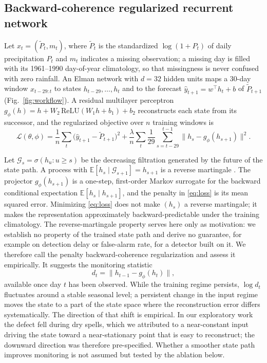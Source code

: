 \documentclass[pdflatex,sn-mathphys-ay]{sn-jnl}
\theoremstyle{thmstyletwo}
\begin{document}
\subsection{Backward-coherence regularized recurrent network}\label{sec:model}
Let $x_t=(\tilde P_t,m_t)$, where $\tilde P_t$ is the standardized $\log(1+P_t)$ of daily precipitation
$P_t$ and $m_t$ indicates a missing observation; a missing day is filled with its 1961--1990
day-of-year climatology, so that missingness is never confused with zero rainfall. An Elman network with
$d=32$ hidden units maps a 30-day window $x_{t-29:t}$ to states $h_{t-29},\dots,h_t$ and to the
forecast $\hat y_{t+1}=w^\top h_t+b$ of $\tilde P_{t+1}$ (Fig.~\ref{fig:workflow}). A residual
multilayer perceptron $g_\phi(h)=h+W_2\,\mathrm{ReLU}(W_1h+b_1)+b_2$ reconstructs each state from its
successor, and the regularized objective over $n$ training windows is
\begin{equation}\label{eq:loss}
 \mathcal L(\theta,\phi)=\frac1n\sum_{t}\bigl(\hat y_{t+1}-\tilde P_{t+1}\bigr)^2
 +\frac{\lambda}{n}\sum_{t}\frac1{29}\sum_{s=t-29}^{t-1}\bigl\|h_s-g_\phi(h_{s+1})\bigr\|^2 .
\end{equation}

Let $\mathcal G_s=\sigma(h_u:u\ge s)$ be the decreasing filtration generated by the future of the
state path. A process with $\mathbb E[h_s\mid\mathcal G_{s+1}]=h_{s+1}$ is a reverse martingale
\citep{doob1953}. The projector $g_\phi(h_{s+1})$ is a one-step, first-order Markov surrogate for the
backward conditional expectation $\mathbb E[h_s\mid h_{s+1}]$, and the penalty in \eqref{eq:loss} is
its mean squared error. Minimizing \eqref{eq:loss} does not make $(h_s)$ a reverse martingale; it makes
the representation approximately backward-predictable under the training climatology. The
reverse-martingale property serves here only as motivation: we establish no property of the trained state
path and derive no guarantee, for example on detection delay or false-alarm rate, for a detector built on
it. We therefore call the penalty backward-coherence regularization and assess it empirically. It
suggests the monitoring statistic
\begin{equation}\label{eq:defect}
 d_t=\bigl\|h_{t-1}-g_\phi(h_t)\bigr\|,
\end{equation}
available once day $t$ has been observed. While the training regime persists, $\log d_t$ fluctuates
around a stable seasonal level; a persistent change in the input regime moves the state to a part of
the state space where the reconstruction error differs systematically. The direction of that shift is
empirical. In our exploratory work the defect fell during dry spells, which we attributed to a
near-constant input driving the state toward a near-stationary point that is easy to reconstruct; the
downward direction was therefore pre-specified. Whether a smoother state path improves monitoring is not assumed but
tested by the ablation below.
\end{document}
